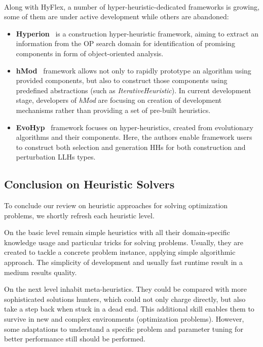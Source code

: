 \paragraph{}
Along with HyFlex, a number of hyper-heuristic-dedicated frameworks is growing, some of them are under active development while others are abandoned:
\begin{itemize}
	\item \textbf{Hyperion}~\cite{swan2011hyperion} is a construction hyper-heuristic framework, aiming to extract an information from the OP search domain for identification of promising components in form of object-oriented analysis.
	
	\item \textbf{hMod}~\cite{urra2013hMod} framework allows not only to rapidly prototype an algorithm using provided components, but also to construct those components using predefined abstractions (such as \emph{IterativeHeuristic}). In current development stage, developers of \emph{hMod} are focusing on creation of development mechanisms rather than providing a set of pre-built heuristics. 
	
	\item \textbf{EvoHyp}~\cite{pillay2017evohyp} framework focuses on hyper-heuristics, created from evolutionary algorithms and their components. Here, the authors enable framework users to construct both selection and generation HHs for both construction and perturbation LLHs types.
\end{itemize}


\subsection{Conclusion on Heuristic Solvers}
To conclude our review on heuristic approaches for solving optimization problems, we shortly refresh each heuristic level.

On the basic level remain simple heuristics with all their domain-specific knowledge usage and particular tricks for solving problems. Usually, they are created to tackle a concrete problem instance, applying simple algorithmic approach. The simplicity of development and usually fast runtime result in a medium results quality.

On the next level inhabit meta-heuristics. They could be compared with more sophisticated solutions hunters, which could not only charge directly, but also take a step back when stuck in a dead end. This additional skill enables them to survive in new and complex environments (optimization problems). However, some adaptations to understand a specific problem and parameter tuning for better performance still should be performed.

